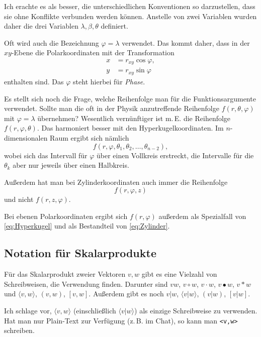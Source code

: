\documentclass[a4paper,11pt,fleqn,twoside,BCOR=16mm]{scrartcl}
\begin{document}
Ich erachte es als besser, die unterschiedlichen Konventionen so
darzustellen, dass sie ohne Konflikte verbunden werden können.
Anstelle von zwei Variablen wurden daher die drei Variablen
$\lambda,\beta,\theta$ definiert.

Oft wird auch die Bezeichnung $\varphi=\lambda$ verwendet.
Das kommt daher, dass in der $xy$-Ebene die Polarkoordinaten
mit der Transformation
\begin{equation}
  \begin{split}
  x &= r_{xy}\cos\varphi,\\
  y &= r_{xy}\sin\varphi
  \end{split}
\end{equation}
enthalten sind. Das $\varphi$ steht hierbei für \emph{Phase}.

Es stellt sich noch die Frage, welche Reihenfolge man für die
Funktionsargumente verwendet. Sollte man die oft in
der Physik anzutreffende Reihenfolge $f(r,\theta,\varphi)$
mit $\varphi=\lambda$ übernehmen? Wesentlich vernünftiger ist m.\,E.
die Reihenfolge $f(r,\varphi,\theta)$. Das harmoniert besser mit
den Hyperkugelkoordinaten. Im $n$-dimensionalen Raum ergibt sich
nämlich
\begin{equation}\label{eq:Hyperkugel}
f(r,\varphi,\theta_1,\theta_2,\ldots,\theta_{n-2}),
\end{equation}
wobei sich das Intervall für $\varphi$ über einen Vollkreis
erstreckt, die Intervalle für die $\theta_k$ aber nur jeweils
über einen Halbkreis.

Außerdem hat man bei Zylinderkoordinaten auch immer die
Reihenfolge%
\begin{equation}\label{eq:Zylinder}
f(r,\varphi,z)
\end{equation}
und nicht $f(r,z,\varphi)$.

Bei ebenen Polarkoordinaten ergibt sich $f(r,\varphi)$
außerdem als Spezialfall von \eqref{eq:Hyperkugel}
und als Bestandteil von \eqref{eq:Zylinder}.


\subsection{Notation für Skalarprodukte}
Für das Skalarprodukt zweier Vektoren $v,w$ gibt es eine Vielzahl von
Schreibweisen, die Verwendung finden. Darunter sind $vw$, $v\circ w$,
$v\cdot w$, $v\bullet w$, $v*w$ und $\langle v,w\rangle$,
$(v,w)$, $[v,w]$. Außerdem gibt es noch $v|w$, $\langle v|w\rangle$,
$(v|w)$, $[v|w]$.

Ich schlage vor, $\langle v,w\rangle$ (einschließlich
$\langle v|w\rangle$) als einzige Schreibweise zu verwenden.
Hat man nur Plain-Text zur Verfügung (z.\,B. im Chat), so
kann man \verb|<v,w>| schreiben.
\end{document}

